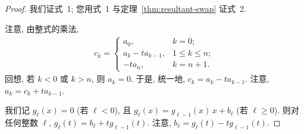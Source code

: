 \documentclass[../libro.tex]{subfiles}
\begin{document}
\begin{proof}
    我们证式~1;
    您用式~1 与定理~\ref{thm:resultant-swap} 证式~2.

    注意, 由整式的乘法,
    \begin{align*}
        c_k =
        \begin{cases}
            a_0,             & k = 0;           \\
            a_k - t a_{k-1}, & 1 \leq k \leq n; \\
            -t a_n,          & k = n + 1.
        \end{cases}
    \end{align*}
    回想, 若 \(k < 0\) 或 \(k > n\),
    则 \(a_k = 0\).
    于是, 统一地, \(c_k = a_k - t a_{k-1}\).
    注意, \(a_k = c_k + t a_{k-1}\).

    我们记
    \(g_\ell (x) = 0\)
    (若 \(\ell < 0\)),
    且
    \(g_\ell (x) = g_{\ell-1} (x)\, x + b_\ell\)
    (若 \(\ell \geq 0\)).
    则对任何整数 \(\ell\),
    \(g_\ell (t) = b_\ell + t g_{\ell-1} (t)\).
    注意, \(b_\ell = g_\ell (t) - t g_{\ell-1} (t)\).


\end{proof}
\end{document}
